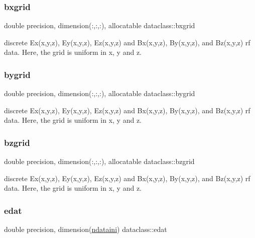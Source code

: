 \subsubsection{\texorpdfstring{bxgrid}{bxgrid}}
{\footnotesize\ttfamily double precision, dimension(\+:,\+:,\+:), allocatable dataclass\+::bxgrid}



discrete Ex(x,y,z), Ey(x,y,z), Ez(x,y,z) and Bx(x,y,z), By(x,y,z), and Bz(x,y,z) rf data. Here, the grid is uniform in x, y and z. 

\mbox{\label{namespacedataclass_aa12722da71ea440ed769b715936c87a3}} 
\subsubsection{\texorpdfstring{bygrid}{bygrid}}
{\footnotesize\ttfamily double precision, dimension(\+:,\+:,\+:), allocatable dataclass\+::bygrid}



discrete Ex(x,y,z), Ey(x,y,z), Ez(x,y,z) and Bx(x,y,z), By(x,y,z), and Bz(x,y,z) rf data. Here, the grid is uniform in x, y and z. 

\mbox{\label{namespacedataclass_aabd84b55c65371356291620ee4dceb06}} 
\subsubsection{\texorpdfstring{bzgrid}{bzgrid}}
{\footnotesize\ttfamily double precision, dimension(\+:,\+:,\+:), allocatable dataclass\+::bzgrid}



discrete Ex(x,y,z), Ey(x,y,z), Ez(x,y,z) and Bx(x,y,z), By(x,y,z), and Bz(x,y,z) rf data. Here, the grid is uniform in x, y and z. 

\mbox{\label{namespacedataclass_a67357b933079ed021a94705c576fead0}} 
\subsubsection{\texorpdfstring{edat}{edat}}
{\footnotesize\ttfamily double precision, dimension(\mbox{\hyperlink{namespacedataclass_a2578bbe9c4dc0892ee08a8619cd7e978}{ndataini}}) dataclass\+::edat}




